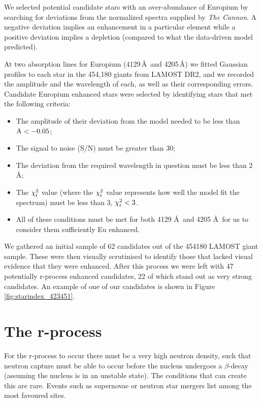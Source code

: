 \documentclass[a4paper,fleqn,usenatbib]{mnras}
\begin{document}
	We selected potential candidate stars with an over-abundance of Europium by searching for deviations from the normalized spectra supplied by \textit{The Cannon}. A negative deviation implies an enhancement in a particular element while a positive deviation implies a depletion (compared to what the data-driven model predicted). 
	
	At two absorption lines for Europium (4129\,\AA\ and 4205\,\AA) we fitted Gaussian profiles to each star in the 454,180 giants from LAMOST DR2, and we recorded the amplitude and the wavelength of each, as well as their corresponding errors. Candidate Europium enhanced stars were selected by identifying stars that met the following criteria:
	
	\begin{itemize}
		\item The amplitude of their deviation from the model needed to be less than $\rm{A}<-0.05$;
		\item The signal to noise (S/N) must be greater than 30;
		\item The deviation from the required wavelength in question must be less than 2 \AA;
		\item The $\chi_{\rm{r}}^{2}$ value (where the $\chi_{\rm{r}}^{2}$ value represents how well the model fit the spectrum) must be less than 3, $\chi_{\rm{r}}^{2}<3$.
		\item All of these conditions must be met for both 4129 \AA\ and 4205 \AA\ for us to consider them sufficiently Eu enhanced.
	\end{itemize}   
	
	We gathered an initial sample of 62 candidates out of the 454180 LAMOST giant sample. These were then visually scrutinised to identify those that lacked visual evidence that they were enhanced. After this process we were left with 47 potentially r-process enhanced candidates, 22 of which stand out as very strong candidates. An example of one of our candidates is shown in Figure \ref{fig:starindex_423451}.
	
	\section{The r-process}
	For the r-process to occur there must be a very high neutron density, such that neutron capture must be able to occur before the nucleus undergoes a $\beta$-decay (assuming the nucleus is in an unstable state). The conditions that can create this are rare. Events such as supernovae or neutron star mergers list among the most favoured sites.
	
\end{document}
